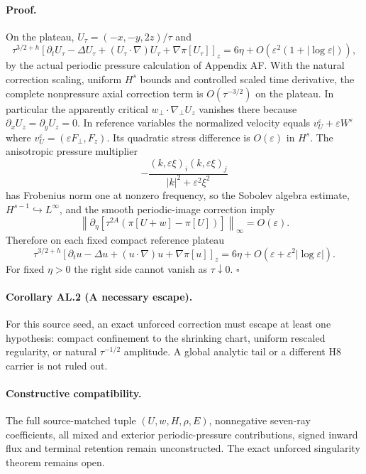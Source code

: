 \paragraph{Proof.}
On the plateau, $U_\tau=(-x,-y,2z)/\tau$ and
\[
 \tau^{3/2+h}[\partial_tU_\tau-\Delta U_\tau+
  (U_\tau\cdot\nabla)U_\tau+\nabla\pi[U_\tau]]_z
 =6\eta+O(\varepsilon^2(1+|\log\varepsilon|)),
\]
by the actual periodic pressure calculation of Appendix AF.
With the natural correction scaling, uniform $H^s$ bounds and controlled scaled time derivative, the complete nonpressure axial correction term is $O(\tau^{-3/2})$ on the plateau. In particular the apparently critical $w_\perp\cdot\nabla_\perp U_z$ vanishes there because $\partial_xU_z=\partial_yU_z=0$.
In reference variables the normalized velocity equals
$v_U^\varepsilon+\varepsilon W^\varepsilon$ where
$v_U^\varepsilon=(\varepsilon F_\perp,F_z)$.
Its quadratic stress difference is $O(\varepsilon)$ in $H^s$.
The anisotropic pressure multiplier
\[
 -\frac{(k,\varepsilon\xi)_i(k,\varepsilon\xi)_j}
 {|k|^2+\varepsilon^2\xi^2}
\]
has Frobenius norm one at nonzero frequency, so the Sobolev algebra estimate,
$H^{s-1}\hookrightarrow L^\infty$, and the smooth periodic-image correction imply
\[
 \left\|\partial_\eta[\tau^{2A}(\pi[U+w]-\pi[U])]\right\|_\infty
 =O(\varepsilon).
\]
Therefore on each fixed compact reference plateau
\[
 \tau^{3/2+h}[\partial_tu-\Delta u+
  (u\cdot\nabla)u+\nabla\pi[u]]_z
 =6\eta+O(\varepsilon+\varepsilon^2|\log\varepsilon|).
\]
For fixed $\eta>0$ the right side cannot vanish as $\tau\downarrow0$.
\hfill$\square$

\paragraph{Corollary AL.2 (A necessary escape).}
For this source seed, an exact unforced correction must escape at least one hypothesis: compact confinement to the shrinking chart, uniform rescaled regularity, or natural $\tau^{-1/2}$ amplitude. A global analytic tail or a different H8 carrier is not ruled out.

\paragraph{Constructive compatibility.}
The full source-matched tuple $(U,w,H,\rho,E)$, nonnegative seven-ray coefficients, all mixed and exterior periodic-pressure contributions, signed inward flux and terminal retention remain unconstructed. The exact unforced singularity theorem remains open.
